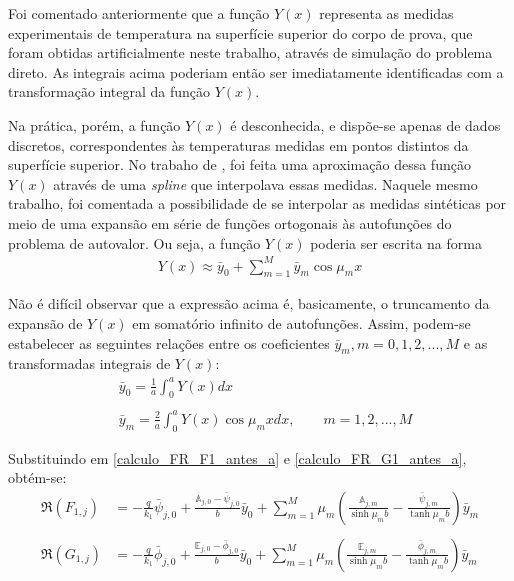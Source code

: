Foi comentado anteriormente que a função $Y(x)$ representa as medidas experimentais de temperatura na superfície superior do corpo de prova, que foram obtidas artificialmente neste trabalho, através de simulação do problema direto. As integrais acima poderiam então ser imediatamente identificadas com a transformação integral da função $Y(x)$.

Na prática, porém, a função $Y(x)$ é desconhecida, e dispõe-se apenas de dados discretos, correspondentes às temperaturas medidas em pontos distintos da superfície superior. No trabaho de \cite{tese_padilha}, foi feita uma aproximação dessa função $Y(x)$ através de uma \textit{spline} que interpolava essas medidas. Naquele mesmo trabalho, foi comentada a possibilidade de se interpolar as medidas sintéticas por meio de uma expansão em série de funções ortogonais às autofunções do problema de autovalor. Ou seja, a função $Y(x)$ poderia ser escrita na forma
\begin{align}
Y(x) \approx \bar{y}_0 + \sum_{m=1}^M \bar{y}_m \cos\mu_m x \label{aproximacao_Y}
\end{align}

Não é difícil observar que a expressão acima é, basicamente, o truncamento da expansão de $Y(x)$ em somatório infinito de autofunções. Assim, podem-se estabelecer as seguintes relações entre os coeficientes $\bar{y}_m, m=0,1,2,...,M$ e as transformadas integrais de $Y(x)$:
\begin{align}
& \bar{y}_0 = \frac{1}{a}\int_0^a Y(x) dx \\ \nonumber \\
& \bar{y}_m = \frac{2}{a}\int_0^a Y(x) \cos\mu_m x dx, \qquad m = 1, 2, ..., M
\end{align}

Substituindo em \eqref{calculo_FR_F1_antes_a} e \eqref{calculo_FR_G1_antes_a}, obtém-se:
\begin{align}
\Re(F_{1,j})
& =
-\frac{q}{k_1}\bar{\psi}_{j,0} + \frac{\mathbb{A}_{j,0} - \bar{\psi}_{j,0}}{b} \bar{y}_0 + \sum_{m=1}^M \mu_m \left(\frac{\mathbb{A}_{j,m}}{\sinh\mu_m b} - \frac{\bar{\psi}_{j, m}}{\tanh\mu_m b}\right)\bar{y}_m
\label{calculo_FR_F1_antes_b} \\ \nonumber \\
\Re(G_{1,j})
& =
-\frac{q}{k_1}\bar{\phi}_{j,0} + \frac{\mathbb{E}_{j,0} - \bar{\phi}_{j,0}}{b} \bar{y}_0 + \sum_{m=1}^M \mu_m \left(\frac{\mathbb{E}_{j,m}}{\sinh\mu_m b} - \frac{\bar{\phi}_{j, m}}{\tanh\mu_m b}\right)\bar{y}_m
\label{calculo_FR_G1_antes_b}
\end{align}

